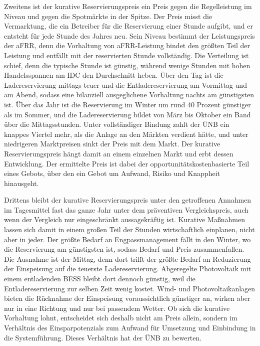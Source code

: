 Zweitens ist der kurative Reservierungspreis ein Preis gegen die Regelleistung im Niveau und gegen die Spotmärkte in der Spitze.
Der Preis misst die Vermarktung, die ein Betreiber für die Reservierung einer Stunde aufgibt, und er entsteht für jede Stunde des Jahres neu.
Sein Niveau bestimmt der Leistungspreis der \ac{aFRR}, denn die Vorhaltung von \ac{aFRR}-Leistung bindet den größten Teil der Leistung und entfällt mit der reservierten Stunde vollständig.
Die Verteilung ist schief, denn die typische Stunde ist günstig, während wenige Stunden mit hohen Handelsspannen am \ac{IDC} den Durchschnitt heben.
Über den Tag ist die Ladereservierung mittags teuer und die Entladereservierung am Vormittag und am Abend, sodass eine bilanziell ausgeglichene Vorhaltung nachts am günstigsten ist.
Über das Jahr ist die Reservierung im Winter um rund 40 Prozent günstiger als im Sommer, und die Ladereservierung bildet von März bis Oktober ein Band über die Mittagsstunden.
Unter vollständiger Bindung zahlt der \ac{ÜNB} ein knappes Viertel mehr, als die Anlage an den Märkten verdient hätte, und unter niedrigeren Marktpreisen sinkt der Preis mit dem Markt.
Der kurative Reservierungspreis hängt damit an einem einzelnen Markt und erbt dessen Entwicklung.
Der ermittelte Preis ist dabei der opportunitätskostenbasierte Teil eines Gebots, über den ein Gebot um Aufwand, Risiko und Knappheit hinausgeht.

Drittens bleibt der kurative Reservierungspreis unter den getroffenen Annahmen im Tagesmittel fast das ganze Jahr unter dem präventiven Vergleichspreis, auch wenn der Vergleich nur eingeschränkt aussagekräftig ist.
Kurative Maßnahmen lassen sich damit in einem großen Teil der Stunden wirtschaftlich einplanen, nicht aber in jeder.
Der größte Bedarf an Engpassmanagement fällt in den Winter, wo die Reservierung am günstigsten ist, sodass Bedarf und Preis zusammenfallen.
Die Ausnahme ist der Mittag, denn dort trifft der größte Bedarf an Reduzierung der Einspeisung auf die teuerste Ladereservierung.
Abgeregelte Photovoltaik mit einem entladenden \ac{BESS} bleibt dort dennoch günstig, weil die Entladereservierung zur selben Zeit wenig kostet.
Wind- und Photovoltaikanlagen bieten die Rücknahme der Einspeisung voraussichtlich günstiger an, wirken aber nur in eine Richtung und nur bei passendem Wetter.
Ob sich die kurative Vorhaltung lohnt, entscheidet sich deshalb nicht am Preis allein, sondern im Verhältnis des Einsparpotenzials zum Aufwand für Umsetzung und Einbindung in die Systemführung.
Dieses Verhältnis hat der \ac{ÜNB} zu bewerten.

